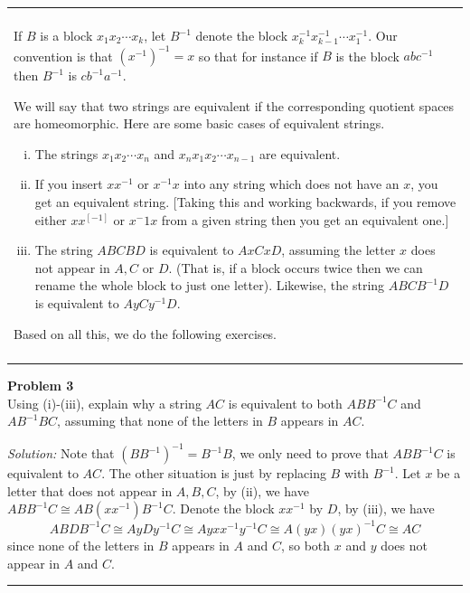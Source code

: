 \documentclass[a4paper, 12pt]{article}
\newenvironment{problem}[2][Problem]
    { \begin{mdframed}[backgroundcolor=gray!20] \textbf{#1 #2} \\}
    {  \end{mdframed}}
\newenvironment{background}
{\begin{center}
    \begin{tabular}{|p{\textwidth}|}
    \hline\\
    }
    { 
    \\\\\hline
    \end{tabular} 
    \end{center}}
\newenvironment{solution}
    {\textit{Solution:}}
    {}
\begin{document}
\begin{background}
If \(B\) is a block \(x_1x_2\cdots x_k\), let \(B^{-1}\) denote the block \(x_k^{-1}x_{k-1}^{-1}\cdots x_1^{-1}\). Our convention is that \((x^{-1})^{-1}=x\) so that for instance if \(B\) is the block \(abc^{-1}\) then 
\(B^{-1}\) is \(cb^{-1}a^{-1}\).

We will say that two strings are equivalent if the corresponding quotient spaces are homeomorphic. Here are some basic cases of equivalent strings. 
\begin{enumerate}[(i)]
\item The strings \(x_1x_2\cdots x_n\) and \(x_nx_1x_2 \cdots x_{n-1}\) are equivalent. 
\item If you insert \(xx^{-1}\) or \(x^{-1}x\) into any string which does not have an \(x\), you get an equivalent string. [Taking this and working backwards, if you remove either \(xx^[-1]\) or \(x^-1x\) from a given string then you get an 
equivalent one.]
\item The string \(ABCBD\) is equivalent to \(AxCxD\), assuming the letter \(x\) does not appear in \(A,C\) or \(D\). (That is, if a block occurs twice then we can rename the whole block to just one letter). Likewise, the string \(ABCB^{-1}D\) is equivalent to \(AyCy^{-1}D\).
\end{enumerate}
Based on all this, we do the following exercises.
\end{background}

\begin{problem}{3}
Using (i)-(iii), explain why a string \(AC\) is equivalent to both \(ABB^{-1}C\) and \(AB^{-1}BC\), assuming that none of the letters in \(B\) appears in \(AC\).
\end{problem}
\begin{solution}
Note that \((BB^{-1})^{-1}=B^{-1}B\), we only need to prove that \(ABB^{-1}C\) is equivalent to \(AC\). The other situation is just by replacing \(B\) with \(B^{-1}\). Let \(x\) be a letter that does not appear in \(A,B,C\), by (ii), we have 
\(ABB^{-1}C\cong AB(xx^{-1})B^{-1}C\). Denote the block \(xx^{-1}\) by \(D\), by (iii), we have 
\[ABDB^{-1}C\cong AyDy^{-1}C\cong Ayxx^{-1}y^{-1}C\cong A(yx)(yx)^{-1}C\cong AC\]
since none of the letters in \(B\) appears in \(A\) and \(C\), so both \(x\) and \(y\) does not appear in \(A\) and \(C\).
\end{solution}

\noindent\rule{7in}{2.8pt}
\end{document}
